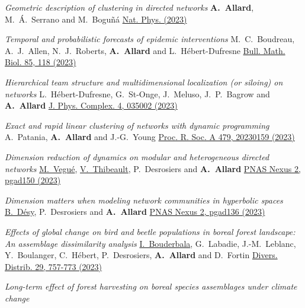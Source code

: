 \documentclass[11pt]{article}
\makeatletter
\newcommand{\reversearabic}[1]{\expandafter\@reversearabic\csname c@#1\endcsname}
\newcommand{\@reversearabic}[1]{%
  \number\numexpr\getrefnumber{this@etaremune@\romannumeral\c@etaremune}-#1+1\relax
}
\newcounter{etaremune}
\newenvironment{etaremune}[1][]{%
  \stepcounter{etaremune}%
  \begin{enumerate}[label=\reversearabic*.,#1]%
}{%
  \edef\@currentlabel{\the\csname c@\@enumctr\endcsname}%
  \label{this@etaremune@\romannumeral\c@etaremune}%
  \end{enumerate}%
}
\makeatother
\begin{document}
\begin{etaremune}[itemsep=0.5em, label={[A\reversearabic*]}]
%
  \item \parbox[t]{\textwidth-30pt}{\textit{Geometric description of clustering in directed networks}\split
  \textbf{A.~Allard}, M.~\'A.~Serrano and M.~Bogu\~n\'a\split
  \href{https://doi.org/10.1038/s41567-023-02246-6}{Nat. Phys. (2023)}}
%
  \item \parbox[t]{\textwidth-30pt}{\textit{Temporal and probabilistic forecasts of epidemic interventions}\split
  M.~C.~Boudreau, A.~J.~Allen, N.~J.~Roberts, \textbf{A.~Allard} and L.~H\'ebert-Dufresne\split
  \href{https://doi.org/10.1007/s11538-023-01220-w}{Bull. Math. Biol. 85, 118 (2023)}}
%
  \item \parbox[t]{\textwidth-30pt}{\textit{Hierarchical team structure and multidimensional localization (or siloing) on networks}\split
  L.~Hébert-Dufresne, G.~St-Onge, J.~Meluso, J.~P.~Bagrow and \textbf{A.~Allard}\split
  \href{https://doi.org/10.1088/2632-072X/ace602}{J. Phys. Complex. 4, 035002 (2023)}}
%
  \item \parbox[t]{\textwidth-30pt}{\textit{Exact and rapid linear clustering of networks with dynamic programming}\split
  A.~Patania, \textbf{A.~Allard} and J.-G.~Young\split
  \href{https://doi.org/10.1098/rspa.2023.0159}{Proc. R. Soc. A 479, 20230159 (2023)}}
%
  \item \parbox[t]{\textwidth-30pt}{\textit{Dimension reduction of dynamics on modular and heterogeneous directed networks}\split
  \uline{M.~Vegué}, \uline{V.~Thibeault}, P.~Desrosiers and \textbf{A.~Allard}\split
  \href{https://doi.org/10.1093/pnasnexus/pgad150}{PNAS Nexus 2, pgad150 (2023)}}
%
  \item \parbox[t]{\textwidth-30pt}{\textit{Dimension matters when modeling network communities in hyperbolic spaces}\split
  \uline{B.~Désy}, P.~Desrosiers and \textbf{A.~Allard}\split
  \href{https://doi.org/10.1093/pnasnexus/pgad136}{PNAS Nexus 2, pgad136 (2023)}}
%
  \item \parbox[t]{\textwidth-30pt}{\textit{Effects of global change on bird and beetle populations in boreal forest landscape: An assemblage dissimilarity analysis}\split
  \uline{I.~Bouderbala}, G.~Labadie, J.-M.~Leblanc, Y.~Boulanger, C.~Hébert, P.~Desrosiers, \textbf{A.~Allard} and D.~Fortin\split
  \href{https://doi.org/10.1111/ddi.13697}{Divers. Distrib. 29, 757-773 (2023)}}
%
  \item \parbox[t]{\textwidth-30pt}{\textit{Long-term effect of forest harvesting on boreal species assemblages under climate change}\split
}
\end{etaremune}
\end{document}

